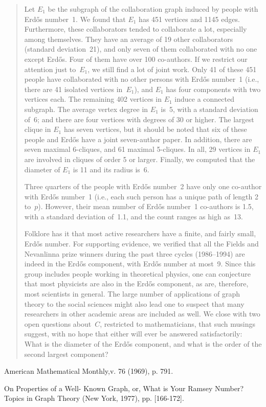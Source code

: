 \begin{quote}
Let $E_1$ be the subgraph of the collaboration graph induced by people with
Erd\H os number~1. We found that $E_1$ has 451 vertices and 1145 edges.
Furthermore, these collaborators tended to collaborate a lot,
especially among themselves. They have an average of 19 other collaborators
(standard deviation~21), and only seven of them collaborated with no one
except Erd\H os. Four of them have over 100 co-authors. If we restrict our
attention just to~$E_1$, we still find a lot of joint work. Only 41 of
these 451 people have collaborated with no other persons with Erd\H os
number~1 (i.e., there are 41 isolated vertices in~$E_1$), and $E_1$ has
four components with two vertices each. The remaining 402 vertices in $E_1$
induce a connected subgraph. The average vertex degree in $E_1$ is~5, with
a standard deviation of~6; and there are four vertices with degrees of 30
or higher. The largest clique in $E_1$ has seven vertices, but it should be
noted that six of these people and Erd\H os have a joint seven-author
paper. In addition, there are seven maximal 6-cliques, and 61 maximal
5-cliques. In all, 29 vertices in $E_1$ are involved in cliques of order 5
or larger. Finally, we computed that the diameter of $E_1$
is 11 and its radius is~6.

Three quarters of the people with Erd\H os number~2 have only one co-author
with Erd\H os number~1 (i.e., each such person has a unique path of length 2
to~$p$). However, their mean number of Erd\H os number~1 co-authors is
1.5, with a standard deviation of~1.1, and the count ranges as high as~13.

Folklore has it that most active researchers have a finite, and fairly
small, Erd\H os number. For supporting evidence, we verified that all the
Fields and Nevanlinna prize winners during the past three cycles
(1986--1994) are indeed in the Erd\H os component, with Erd\H os number at
most~9. Since this group includes people working in theoretical physics,
one can conjecture that most physicists are also in the Erd\H os component,
as are, therefore, most scientists in general. The large number
of applications of graph theory to the social sciences might also lead one
to suspect that many researchers in other academic areas are included as
well. We close with two open questions about~$C$, restricted to
mathematicians, that such musings suggest, with no hope that either will ever
be answered satisfactorily: What is the diameter of the Erd\H os
component, and what is the order of the second largest component?
\end{quote}

   \Ref

    {American Mathematical Monthly,}{v. 76 (1969), p. 791.}

    {On Properties of a
   Well- Known Graph, or, What is Your Ramsey Number?}
   { Topics in Graph Theory}{ (New York, 1977), pp.  [166-172].}



